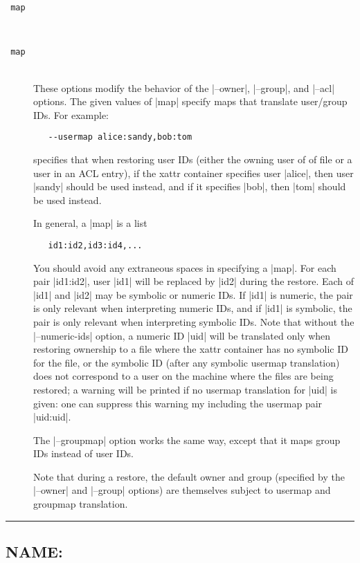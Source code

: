 \documentclass[11pt]{article}
\def\sepline{\begin{center}\rule{5in}{1pt}\end{center}}
\begin{document}
\begin{description}
\item[{\tt {} map}] \ \\[-3ex]
\item[{\tt {} map}] \ \\
These options modify the behavior of the |--owner|, |--group|,
and |--acl| options.
The given values of |map| specify maps that translate
user/group IDs.
For example:
\begin{Verbatim}
   --usermap alice:sandy,bob:tom
\end{Verbatim}
specifies that when restoring user IDs (either the owning user of
of file or a user in an ACL entry),
if the xattr container specifies user |alice|, then user |sandy|
should be used instead, and if it specifies |bob|, then |tom| should
be used instead.

In general, a |map| is a list 
\begin{Verbatim}
   id1:id2,id3:id4,...
\end{Verbatim}
You should avoid any extraneous spaces in specifying a |map|.
For each pair |id1:id2|, user |id1| will be replaced by |id2|
during the restore.
Each of |id1| and |id2| may be symbolic or numeric IDs.
If |id1| is numeric, the pair is only relevant when interpreting
numeric IDs, and if |id1| is symbolic, the pair is only
relevant when interpreting symbolic IDs.
Note that without the |--numeric-ids| option, a numeric ID |uid|
will be translated only when restoring ownership to a file
where the xattr container has no symbolic ID for the file,
or the symbolic ID (after any symbolic usermap translation)
does not correspond to a user on the machine
where the files are being restored;
a warning will be printed if no usermap translation for |uid| is given:
one can suppress this warning my including the usermap pair
|uid:uid|.

The |--groupmap| option works the same way, except that it
maps group IDs instead of user IDs.

Note that during a restore, the default owner and group
(specified by the |--owner| and |--group| options)
are themselves subject to usermap and groupmap translation.
\end{description}





\sepline

\subsection*{NAME: \tt{}}
\end{document}

